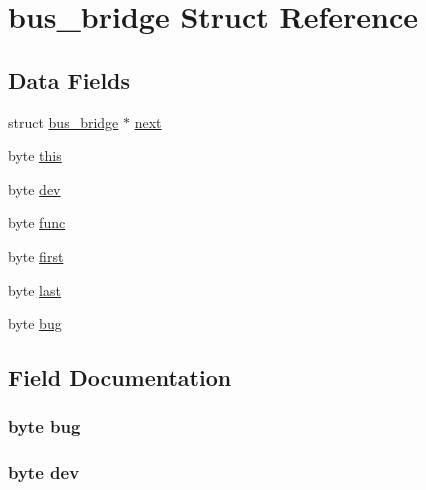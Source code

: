 \hypertarget{structbus__bridge}{}\section{bus\+\_\+bridge Struct Reference}
\label{structbus__bridge}
\subsection*{Data Fields}
\begin{DoxyCompactItemize}
\item 
struct \hyperlink{structbus__bridge}{bus\+\_\+bridge} $\ast$ \hyperlink{structbus__bridge_a65c13bde9be998c616b02a2dcdd2ee05}{next}
\item 
byte \hyperlink{structbus__bridge_a2830d81e1dca5d773cdda5e9e1aa94e9}{this}
\item 
byte \hyperlink{structbus__bridge_a7b0b620be4e75ac39d35df13c47831d4}{dev}
\item 
byte \hyperlink{structbus__bridge_ab852817e2b425f96ac8229168e797b33}{func}
\item 
byte \hyperlink{structbus__bridge_aa74a3e3a9dfdf50ee733d1aa1d7c0ef2}{first}
\item 
byte \hyperlink{structbus__bridge_aea7e8e5343ab38df0625275451f409d7}{last}
\item 
byte \hyperlink{structbus__bridge_a05a8c030949756e35b941aaa8e026616}{bug}
\end{DoxyCompactItemize}


\subsection{Field Documentation}
\subsubsection[{\texorpdfstring{bug}{bug}}]{\setlength{\rightskip}{0pt plus 5cm}byte bug}\hypertarget{structbus__bridge_a05a8c030949756e35b941aaa8e026616}{}\label{structbus__bridge_a05a8c030949756e35b941aaa8e026616}
\subsubsection[{\texorpdfstring{dev}{dev}}]{\setlength{\rightskip}{0pt plus 5cm}byte dev}\hypertarget{structbus__bridge_a7b0b620be4e75ac39d35df13c47831d4}{}\label{structbus__bridge_a7b0b620be4e75ac39d35df13c47831d4}
